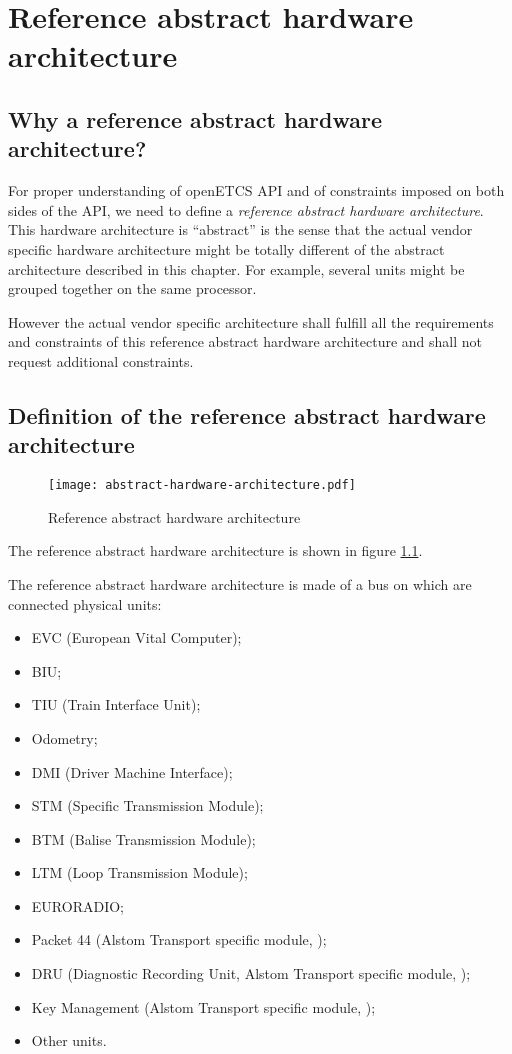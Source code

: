 \chapter{Reference abstract hardware architecture}

\section{Why a reference abstract hardware architecture?}

For proper understanding of openETCS API and of constraints imposed on
both sides of the API, we need to define a \emph{reference abstract
  hardware architecture}. This hardware architecture is ``abstract''
is the sense that the actual vendor specific hardware architecture
might be totally different of the abstract architecture described in
this chapter. For example, several units might be grouped together on
the same processor.

However the actual vendor specific architecture shall fulfill all the
requirements and constraints of this reference abstract hardware
architecture and shall not request additional constraints.

\section{Definition of the reference abstract hardware architecture}

\begin{figure}
  \centering
  \texttt{[image: abstract-hardware-architecture.pdf]}
  \caption{Reference abstract hardware architecture}
  \label{fig:hardware-arch}
\end{figure}

The reference abstract hardware architecture is shown in figure
\ref{fig:hardware-arch}.

The reference abstract hardware architecture is made of a bus on which
are connected physical units:
\begin{itemize}
\item EVC (European Vital Computer);
\item BIU;
\item TIU (Train Interface Unit);
\item Odometry;
\item DMI (Driver Machine Interface);
\item STM (Specific Transmission Module);
\item BTM (Balise Transmission Module);
\item LTM (Loop Transmission Module);
\item EURORADIO;
\item Packet 44 (Alstom Transport specific module, \cite{alstom-api});
\item DRU (Diagnostic Recording Unit, Alstom Transport specific
  module, \cite{alstom-api});
\item Key Management (Alstom Transport specific module,
  \cite{alstom-api});
\item Other units.
\end{itemize}

